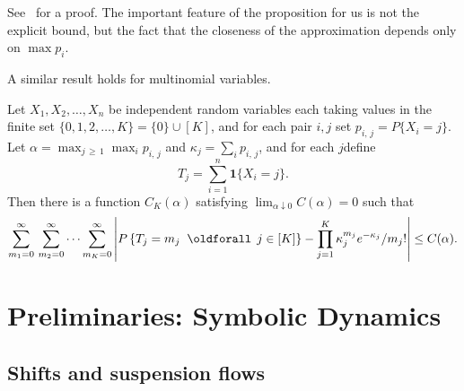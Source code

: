 \documentclass[AHL, Unicode, longabstracts, published]{cedram}
\renewcommand*{\forall}{\mathrel{\oldforall}}
\begin{document}
See~\cite{lecam} for a proof. The important feature of the proposition for us is not the explicit bound, but the fact that the closeness of the approximation depends only on $\max p_{i}$.

A similar result holds for multinomial variables.

\begin{prop}\label{proposition:mult-lsn}
Let $X_{1},X_{2},\dotsc,X_{n}$ be independent random variables each taking values in the finite set $\{0,1,2,\dotsc,K \}=\{0\} \cup [K]$, and for each pair $i,j$ set $p_{i,\,j}=P\{X_{i}=j \}$. Let $\alpha =\max_{j\,\geq\,1}\max_{i}p_{i,\,j}$ and $\kappa_{j}=\sum_{i}p_{i,\,j}$, and for each $j$define
\[
T_{j}=\sum_{i=1}^{n}\mathbf{1}\{X_{i}=j \}.
\]
Then there is a function $C_{K} (\alpha)$ satisfying $\lim_{\alpha \downarrow 0}C (\alpha)=0$ such that
\[
\sum_{m_{1}=0}^{\infty}\,\sum_{m_{2}=0}^{\infty}\dotsb
\sum_{m_{K}=0}^{\infty}
\left\lvert P\left\{T_{j}=m_{j} \;\forall \, j\in [K]\right\} -\prod_{j=1}^{K}\kappa_{j}^{m_{j}}e^{-\kappa_{j}}/m_{j}! \right\rvert \leq C (\alpha).
\]
\end{prop}



\section{Preliminaries: Symbolic Dynamics}\label{sec:symbolicDynamics}

\subsection{Shifts and suspension flows}\label{ssec:suspFlows}
\end{document}
